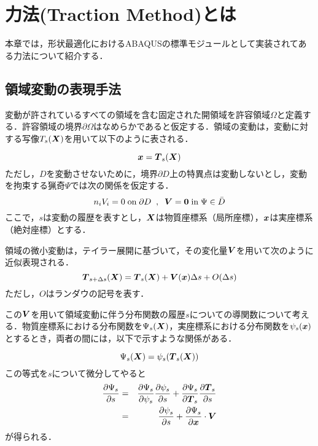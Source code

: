 \section{力法(Traction Method)とは}
本章では，形状最適化におけるABAQUSの標準モジュールとして実装されてある力法について紹介する．
\subsection{領域変動の表現手法}
変動が許されているすべての領域を含む固定された開領域を許容領域$ \Omega $と定義する．許容領域の境界$ \partial \Omega $はなめらかであると仮定する．領域の変動は，変動に対する写像$ T_s({\mbox{\boldmath $X$}}) $を用いて以下のように表される．

\begin{equation}\label{eq:Ts_define}
	{\mbox{\boldmath $x$}} = {\mbox{\boldmath $T$}}_s({\mbox{\boldmath $X$}})
\end{equation}
ただし，$ D $を変動させないために，境界$ \partial D $上の特異点は変動しないとし，変動を拘束する猟奇$ \Psi $では次の関係を仮定する．
\begin{equation}\label{eq:Restrict}
	n_i V_i = 0 \; \text{on} \; \partial D \;\; , \;\;  {\mbox{\boldmath $V$}} = {\mbox{\boldmath $0$}} \; \text{in} \; \Psi \in \bar{D}
\end{equation}
ここで，$ s $は変動の履歴を表すとし，$ {\mbox{\boldmath $X$}} $は物質座標系（局所座標），$ {\mbox{\boldmath $x$}} $は実座標系（絶対座標）とする．

領域の微小変動は，テイラー展開に基づいて，その変化量$ {\mbox{\boldmath $V$}} $を用いて次のように近似表現される．
\begin{equation}\label{eq:Ts_Taylor}
	{\mbox{\boldmath $T$}}_{s+\Delta s}({\mbox{\boldmath $X$}}) = {\mbox{\boldmath $T$}}_s({\mbox{\boldmath $X$}}) + {\mbox{\boldmath $V$}}({\mbox{\boldmath $x$}}) \Delta s + O(\Delta s)
\end{equation}
ただし，$ O $はランダウの記号を表す．

この$ {\mbox{\boldmath $V$}} $を用いて領域変動に伴う分布関数の履歴$ s $についての導関数について考える．物質座標系における分布関数を$ \Psi_s({\mbox{\boldmath $X$}}) $，実座標系における分布関数を$ \psi_s({\mbox{\boldmath $x$}}) $とするとき，両者の間には，以下で示すような関係がある．

\begin{equation}\label{eq:Psiandpsi}
	\Psi_s({\mbox{\boldmath $X$}}) = \psi_s({\mbox{\boldmath $T$}}_s({\mbox{\boldmath $X$}}))
\end{equation}
この等式を$ s $について微分してやると
\begin{eqnarray}
	\frac{\partial \Psi_s}{\partial s} &=& \frac{\partial \Psi_s}{\partial \psi_s} \frac{\partial \psi_s}{\partial s} + \frac{\partial \Psi_s}{\partial {\mbox{\boldmath $T$}}_s} \frac{\partial {\mbox{\boldmath $T$}}_s}{\partial s} \\
	&=& \frac{\partial \psi_s}{\partial s} + \frac{\partial \Psi_s}{\partial {\mbox{\boldmath $x$}}} \cdot {\mbox{\boldmath $V$}}
\end{eqnarray}
が得られる．

